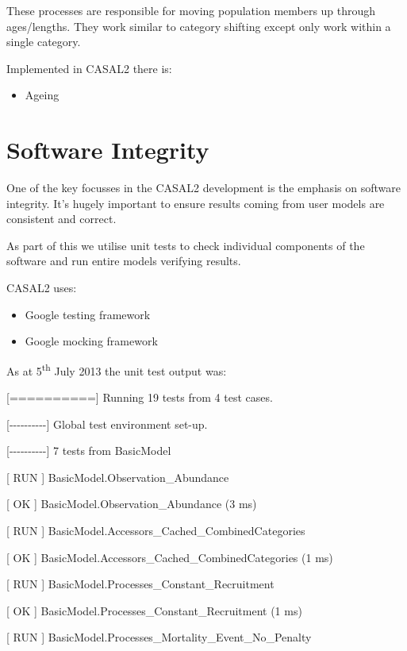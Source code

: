 \documentclass[a4paper,11pt,twoside,pdftex,draft]{article}
\begin{document}
These processes are responsible for moving population members up through
ages/lengths. They work similar to category shifting except only work
within a single category.

Implemented in CASAL2 there is:

\begin{itemize}
\item
  Ageing
\end{itemize}

\hypertarget{software-integrity}{%
\section{Software Integrity}\label{software-integrity}}

One of the key focusses in the CASAL2 development is the emphasis on
software integrity. It's hugely important to ensure results coming from
user models are consistent and correct.

As part of this we utilise unit tests to check individual components of
the software and run entire models verifying results.

CASAL2 uses:

\begin{itemize}
\item
  Google testing framework
\item
  Google mocking framework
\end{itemize}

As at 5\textsuperscript{th} July 2013 the unit test output was:

{[}=========={]} Running 19 tests from 4 test cases.

{[}-\/-\/-\/-\/-\/-\/-\/-\/-\/-{]} Global test environment set-up.

{[}-\/-\/-\/-\/-\/-\/-\/-\/-\/-{]} 7 tests from BasicModel

{[} RUN {]} BasicModel.Observation\_Abundance

{[} OK {]} BasicModel.Observation\_Abundance (3 ms)

{[} RUN {]} BasicModel.Accessors\_Cached\_CombinedCategories

{[} OK {]} BasicModel.Accessors\_Cached\_CombinedCategories (1 ms)

{[} RUN {]} BasicModel.Processes\_Constant\_Recruitment

{[} OK {]} BasicModel.Processes\_Constant\_Recruitment (1 ms)

{[} RUN {]} BasicModel.Processes\_Mortality\_Event\_No\_Penalty
\end{document}
